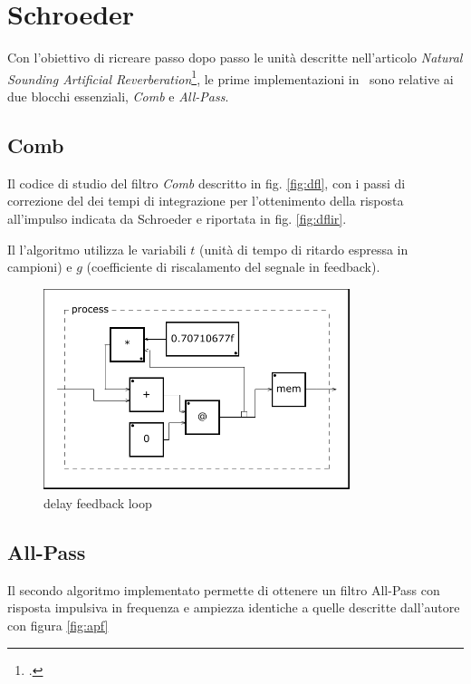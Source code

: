 \section{Schroeder}

Con l’obiettivo di ricreare passo dopo passo le unità descritte nell’articolo
\emph{Natural Sounding Artificial Reverberation}\footcite{ms:rev62}, le prime
implementazioni in \faust~sono relative ai due blocchi essenziali, \emph{Comb}
e \emph{All-Pass}.

\subsection{Comb}

Il codice di studio del filtro \emph{Comb} descritto in fig. \ref{fig:dfl}, con
i passi di correzione del dei tempi di integrazione per l'ottenimento della
risposta all'impulso indicata da Schroeder e riportata in fig. \ref{fig:dflir}.



Il l'algoritmo utilizza le variabili $t$ (unità di tempo di ritardo espressa in
campioni) e $g$ (coefficiente di riscalamento del segnale in feedback).

\begin{figure}[htp]
\centering
\includegraphics[width=0.80\textwidth]{Code/dflc-svg/process.pdf}
\caption{delay feedback loop}
\label{fig:dflfaust}
\end{figure}

\subsection{All-Pass}

Il secondo algoritmo implementato permette di ottenere un filtro All-Pass
con risposta impulsiva in frequenza e ampiezza identiche a quelle descritte
dall'autore con figura \ref{fig:apf}

